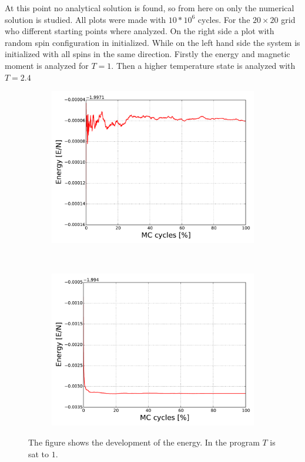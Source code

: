 At this point no analytical solution is found, so from here on only the numerical solution is studied. All plots were made with $10*10^6$ cycles. For the $20\times20$ grid who different starting points where analyzed. On the right side a plot with random spin configuration in initialized. While on the left hand side the system is initialized with all spins in the same direction. Firstly the energy and magnetic moment is analyzed for $T=1$. Then a higher temperature state is analyzed with $T=2.4$

\begin{figure}[H]
    \centering
    \begin{subfigure}{0.5\textwidth}
        \centering
        \includegraphics[width=\linewidth]{result/bilder/20x20/E-N20-T1}
        \caption{}
    \end{subfigure}%
    ~ 
    \begin{subfigure}{0.5\textwidth}
        \centering
        \includegraphics[width=\linewidth]{result/bilder/20x20/E-N20-T1-RNG}
        \caption{}
    \end{subfigure}
    \caption{The figure shows the development of the energy. In the program $T$ is sat to $1$. }
    \label{fig:}
\end{figure}

